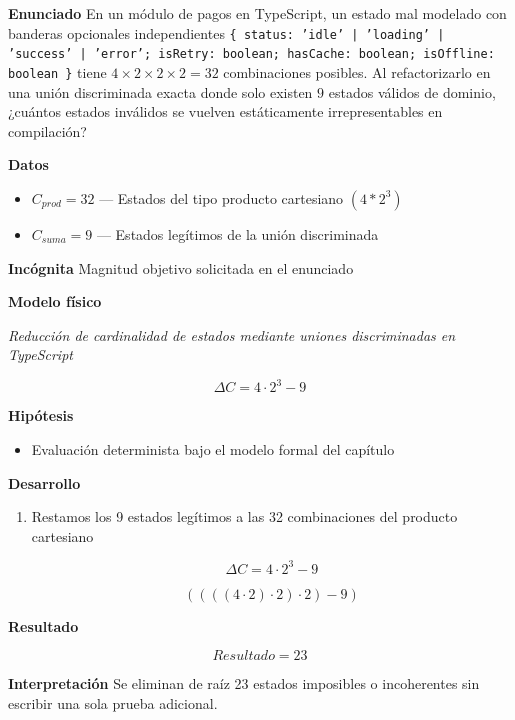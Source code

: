 \documentclass{book}
\begin{document}
\begin{tcolorbox}[title={Problema resuelto}, studiumworked, breakable]

\noindent\textbf{Enunciado}
En un módulo de pagos en TypeScript, un estado mal modelado con banderas opcionales independientes \texttt{\{ status: 'idle' | 'loading' | 'success' | 'error'; isRetry: boolean; hasCache: boolean; isOffline: boolean \}} tiene \(4 \times 2 \times 2 \times 2 = 32\) combinaciones posibles. Al refactorizarlo en una unión discriminada exacta donde solo existen \(9\) estados válidos de dominio, ¿cuántos estados inválidos se vuelven estáticamente irrepresentables en compilación?

\noindent\textbf{Datos}
\begin{itemize}
\item $C_{prod} = 32$ — Estados del tipo producto cartesiano \((4 * 2^3)\)
\item $C_{suma} = 9$ — Estados legítimos de la unión discriminada
\end{itemize}

\noindent\textbf{Incógnita}
Magnitud objetivo solicitada en el enunciado

\noindent\textbf{Modelo físico}

\noindent\textit{Reducción de cardinalidad de estados mediante uniones discriminadas en TypeScript}

\[
\Delta C = 4 \cdot 2^3 - 9
\]

\noindent\textbf{Hipótesis}
\begin{itemize}
\item Evaluación determinista bajo el modelo formal del capítulo
\end{itemize}

\noindent\textbf{Desarrollo}
\begin{enumerate}
\item
Restamos los 9 estados legítimos a las 32 combinaciones del producto cartesiano

\[
\Delta C = 4 \cdot 2^3 - 9
\]

\[
\left(\left(\left(\left(4\cdot 2\right)\cdot 2\right)\cdot 2\right)-9\right)
\]
\end{enumerate}

\noindent\textbf{Resultado}

\[
Resultado = 23
\]

\noindent\textbf{Interpretación}
Se eliminan de raíz 23 estados imposibles o incoherentes sin escribir una sola prueba adicional.


\end{tcolorbox}
\end{document}
